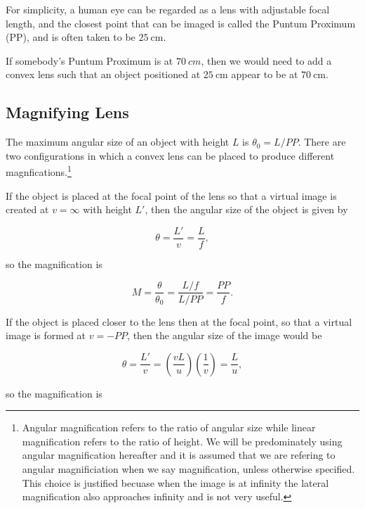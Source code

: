 \documentclass[english,a4paper,12pt]{report}
\begin{document}
For simplicity, a human eye can be regarded as a lens with adjustable focal length, and the closest point that can be imaged is called the Puntum Proximum (PP), and is often taken to be \(\SI{25}{\cm} \).  

If somebody's Puntum Proximum is at \(\SI{70}{cm}\), then we would need to add a convex lens such that an object positioned at \(\SI{25}{\cm} \) appear to be at \(\SI{70}{\cm} \).

\subsection{Magnifying Lens}

The maximum angular size of an object with height \(L\) is \(\theta _{0} = L /PP\). There are two configurations in which a convex lens can be placed to produce different magnfications.\footnote{Angular magnification refers to the ratio of angular size while linear magnification refers to the ratio of height. We will be predominately using angular magnification hereafter and it is assumed that we are refering to angular magnificiation when we say magnification, unless otherwise specified. This choice is justified becuase when the image is at infinity the lateral magnification also approaches infinity and is not very useful.} 

If the object is placed at the focal point of the lens so that a virtual image is created at \(v = \infty\) with height \(L'\), then the angular size of the object is given by

\begin{equation}
    \theta = \frac{L'}{v} = \frac{L}{f},  
\end{equation}

so the magnification is 

\begin{equation}
    M = \frac{\theta }{\theta _{0} } = \frac{L/f}{L/PP} = \frac{PP}{f}. \label{mag} 
\end{equation}

If the object is placed closer to the lens then at the focal point, so that a virtual image is formed at \(v = -PP\), then the angular size of the image would be 

\begin{equation}
    \theta = \frac{L'}{v} = \left( \frac{vL}{u}  \right) \left( \frac{1}{v}  \right) = \frac{L}{u}, 
\end{equation}

so the magnification is 
\end{document}
